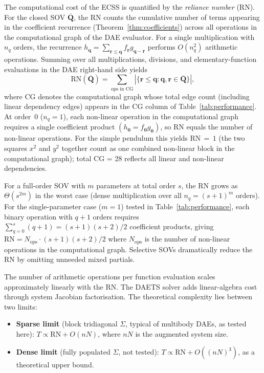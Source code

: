 \documentclass[12pt,a4paper]{article}
\theoremstyle{definition}
\theoremstyle{plain}
\theoremstyle{remark}
\newcommand{\vq}{\mathbf{q}}
\newcommand{\vQ}{\mathbf{Q}}
\newcommand{\vr}{\mathbf{r}}
\newcommand{\vz}{\mathbf{0}}
\begin{document}
The computational cost of the ECSS is quantified by the \emph{reliance number} (RN). For the closed SOV $\overline{\vQ}$, the RN counts the cumulative number of terms appearing in the coefficient recurrence (Theorem~\ref{thm:coefficients}) across all operations in the computational graph of the DAE evaluator. For a single multiplication with $n_q$ orders, the recurrence $h_{\vq} = \sum_{\vr\le\vq} f_\vr g_{\vq-\vr}$ performs $O(n_q^2)$ arithmetic operations. Summing over all multiplications, divisions, and elementary-function evaluations in the DAE right-hand side yields
\[
  \mathrm{RN}(\overline{\vQ}) = \sum_{\text{ops in CG}} |\{\vr \le \vq : \vq,\vr\in\overline{\vQ}\}|,
\]
where CG denotes the computational graph whose total edge count (including linear dependency edges) appears in the CG column of Table~\ref{tab:performance}. At order~0 ($n_q=1$), each non-linear operation in the computational graph requires a single coefficient product $(h_{\vz}=f_{\vz}g_{\vz})$, so RN equals the number of non-linear operations. For the simple pendulum this yields RN$\,{=}\,1$ (the two squares $x^2$ and $y^2$ together count as one combined non-linear block in the computational graph); total CG = 28 reflects all linear and non-linear dependencies.

For a full-order SOV with $m$ parameters at total order $s$, the RN grows as $\Theta(s^{2m})$ in the worst case (dense multiplication over all $n_q = (s+1)^m$ orders). For the single-parameter case ($m=1$) tested in Table~\ref{tab:performance}, each binary operation with $q+1$ orders requires $\sum_{q=0}^{s}(q+1) = (s+1)(s+2)/2$ coefficient products, giving $\mathrm{RN} = N_{\text{ops}}\cdot(s+1)(s+2)/2$ where $N_{\text{ops}}$ is the number of non-linear operations in the computational graph. Selective SOVs dramatically reduce the RN by omitting unneeded mixed partials.

The number of arithmetic operations per function evaluation scales approximately linearly with the RN. The DAETS solver adds linear-algebra cost through system Jacobian factorisation. The theoretical complexity lies between two limits:
\begin{itemize}[nosep]
  \item \textbf{Sparse limit} (block tridiagonal $\Sigma$, typical of multibody DAEs, as tested here): $T \propto \mathrm{RN} + O(nN)$, where $nN$ is the augmented system size.
  \item \textbf{Dense limit} (fully populated $\Sigma$, not tested): $T \propto \mathrm{RN} + O((nN)^3)$, as a theoretical upper bound.
\end{itemize}
\end{document}
